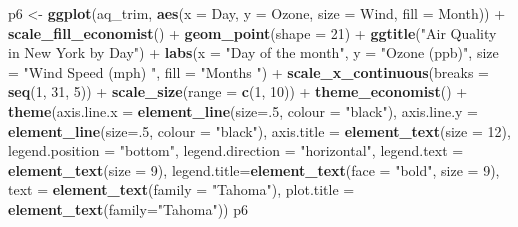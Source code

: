 \documentclass[]{article}
\newenvironment{Shaded}{\begin{snugshade}}{\end{snugshade}}
\newcommand{\KeywordTok}[1]{\textcolor[rgb]{0.13,0.29,0.53}{\textbf{{#1}}}}
\newcommand{\DataTypeTok}[1]{\textcolor[rgb]{0.13,0.29,0.53}{{#1}}}
\newcommand{\DecValTok}[1]{\textcolor[rgb]{0.00,0.00,0.81}{{#1}}}
\newcommand{\StringTok}[1]{\textcolor[rgb]{0.31,0.60,0.02}{{#1}}}
\newcommand{\NormalTok}[1]{{#1}}
\begin{document}
\begin{Shaded}
\begin{Highlighting}[]
\NormalTok{p6 <-}\StringTok{ }\KeywordTok{ggplot}\NormalTok{(aq_trim, }\KeywordTok{aes}\NormalTok{(}\DataTypeTok{x =} \NormalTok{Day, }\DataTypeTok{y =} \NormalTok{Ozone, }\DataTypeTok{size =} \NormalTok{Wind, }\DataTypeTok{fill =} \NormalTok{Month)) +}
\StringTok{      }\KeywordTok{scale_fill_economist}\NormalTok{() +}
\StringTok{      }\KeywordTok{geom_point}\NormalTok{(}\DataTypeTok{shape =} \DecValTok{21}\NormalTok{) +}
\StringTok{      }\KeywordTok{ggtitle}\NormalTok{(}\StringTok{"Air Quality in New York by Day"}\NormalTok{) +}\StringTok{ }
\StringTok{      }\KeywordTok{labs}\NormalTok{(}\DataTypeTok{x =} \StringTok{"Day of the month"}\NormalTok{, }\DataTypeTok{y =} \StringTok{"Ozone (ppb)"}\NormalTok{, }\DataTypeTok{size =} \StringTok{"Wind Speed (mph)  "}\NormalTok{, }\DataTypeTok{fill =} \StringTok{"Months "}\NormalTok{) +}
\StringTok{      }\KeywordTok{scale_x_continuous}\NormalTok{(}\DataTypeTok{breaks =} \KeywordTok{seq}\NormalTok{(}\DecValTok{1}\NormalTok{, }\DecValTok{31}\NormalTok{, }\DecValTok{5}\NormalTok{)) +}
\StringTok{      }\KeywordTok{scale_size}\NormalTok{(}\DataTypeTok{range =} \KeywordTok{c}\NormalTok{(}\DecValTok{1}\NormalTok{, }\DecValTok{10}\NormalTok{)) +}
\StringTok{      }\KeywordTok{theme_economist}\NormalTok{() +}\StringTok{ }
\StringTok{      }\KeywordTok{theme}\NormalTok{(}\DataTypeTok{axis.line.x =} \KeywordTok{element_line}\NormalTok{(}\DataTypeTok{size=}\NormalTok{.}\DecValTok{5}\NormalTok{, }\DataTypeTok{colour =} \StringTok{"black"}\NormalTok{), }
            \DataTypeTok{axis.line.y =} \KeywordTok{element_line}\NormalTok{(}\DataTypeTok{size=}\NormalTok{.}\DecValTok{5}\NormalTok{, }\DataTypeTok{colour =} \StringTok{"black"}\NormalTok{), }
            \DataTypeTok{axis.title =} \KeywordTok{element_text}\NormalTok{(}\DataTypeTok{size =} \DecValTok{12}\NormalTok{),}
            \DataTypeTok{legend.position =} \StringTok{"bottom"}\NormalTok{, }\DataTypeTok{legend.direction =} \StringTok{"horizontal"}\NormalTok{,}
            \DataTypeTok{legend.text =} \KeywordTok{element_text}\NormalTok{(}\DataTypeTok{size =} \DecValTok{9}\NormalTok{),}
            \DataTypeTok{legend.title=}\KeywordTok{element_text}\NormalTok{(}\DataTypeTok{face =} \StringTok{"bold"}\NormalTok{, }\DataTypeTok{size =} \DecValTok{9}\NormalTok{),}
            \DataTypeTok{text =} \KeywordTok{element_text}\NormalTok{(}\DataTypeTok{family =} \StringTok{"Tahoma"}\NormalTok{),}
            \DataTypeTok{plot.title =} \KeywordTok{element_text}\NormalTok{(}\DataTypeTok{family=}\StringTok{"Tahoma"}\NormalTok{))}
\NormalTok{p6}
\end{Highlighting}
\end{Shaded}
\end{document}
